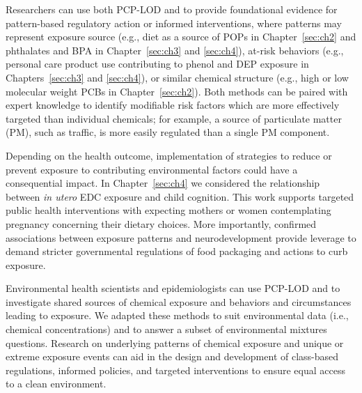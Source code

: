Researchers can use both PCP-LOD and \bnmf to provide foundational evidence for pattern-based regulatory action or informed interventions, where patterns may represent exposure source (e.g., diet as a source of POPs in Chapter~\ref{sec:ch2} and phthalates and BPA in Chapter~\ref{sec:ch3} and  \ref{sec:ch4}), at-risk behaviors (e.g., personal care product use contributing to phenol and DEP exposure in Chapters~\ref{sec:ch3} and \ref{sec:ch4}), or similar chemical structure (e.g., high or low molecular weight PCBs in Chapter~\ref{sec:ch2}). Both methods can be paired with expert knowledge to identify modifiable risk factors which are more effectively targeted than individual chemicals; for example, a source of particulate matter (PM), such as traffic, is more easily regulated than a single PM component.

Depending on the health outcome, implementation of strategies to reduce or prevent exposure to contributing environmental factors could have a consequential impact. In Chapter~\ref{sec:ch4} we considered the relationship between \textit{in utero} EDC exposure and child cognition. This work supports targeted public health interventions with expecting mothers or women contemplating pregnancy concerning their dietary choices. More importantly, confirmed associations between exposure patterns and neurodevelopment provide leverage to demand stricter governmental regulations of food packaging and actions to curb exposure.

Environmental health scientists and epidemiologists can use PCP-LOD and \bnmf to investigate shared sources of chemical exposure and behaviors and circumstances leading to exposure. We adapted these methods to suit environmental data (i.e., chemical concentrations) and to answer a subset of environmental mixtures questions. Research on underlying patterns of chemical exposure and unique or extreme exposure events can aid in the design and development of class-based regulations, informed policies, and targeted interventions to ensure equal access to a clean environment.
